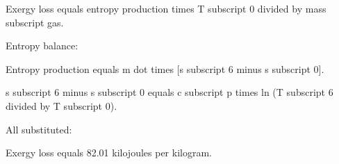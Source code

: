 Exergy loss equals entropy production times T subscript 0 divided by mass subscript gas.  

Entropy balance:  

Entropy production equals m dot times [s subscript 6 minus s subscript 0].  

s subscript 6 minus s subscript 0 equals c subscript p times ln (T subscript 6 divided by T subscript 0).  

All substituted:  

Exergy loss equals 82.01 kilojoules per kilogram.